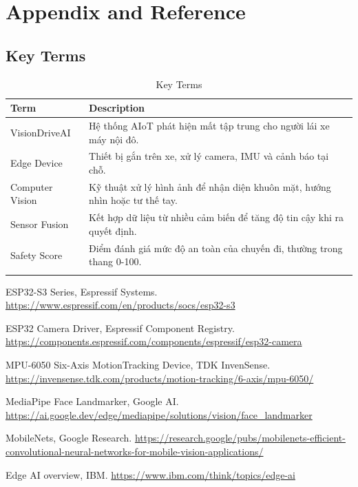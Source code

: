 \documentclass[12pt,a4paper]{article}
\begin{document}
\newpage
\section{Appendix and Reference}

\subsection{Key Terms}

\begin{longtable}{|P{3.2cm}|P{11.2cm}|}
\hline
\textbf{Term} & \textbf{Description} \\
\hline
VisionDriveAI & Hệ thống AIoT phát hiện mất tập trung cho người lái xe máy nội đô. \\
\hline
Edge Device & Thiết bị gắn trên xe, xử lý camera, IMU và cảnh báo tại chỗ. \\
\hline
Computer Vision & Kỹ thuật xử lý hình ảnh để nhận diện khuôn mặt, hướng nhìn hoặc tư thế tay. \\
\hline
Sensor Fusion & Kết hợp dữ liệu từ nhiều cảm biến để tăng độ tin cậy khi ra quyết định. \\
\hline
Safety Score & Điểm đánh giá mức độ an toàn của chuyến đi, thường trong thang 0-100. \\
\hline
\caption{Key Terms}
\end{longtable}

\begin{thebibliography}{9}
ESP32-S3 Series, Espressif Systems. \url{https://www.espressif.com/en/products/socs/esp32-s3}

ESP32 Camera Driver, Espressif Component Registry. \url{https://components.espressif.com/components/espressif/esp32-camera}

MPU-6050 Six-Axis MotionTracking Device, TDK InvenSense. \url{https://invensense.tdk.com/products/motion-tracking/6-axis/mpu-6050/}

MediaPipe Face Landmarker, Google AI. \url{https://ai.google.dev/edge/mediapipe/solutions/vision/face_landmarker}

MobileNets, Google Research. \url{https://research.google/pubs/mobilenets-efficient-convolutional-neural-networks-for-mobile-vision-applications/}

Edge AI overview, IBM. \url{https://www.ibm.com/think/topics/edge-ai}
\end{thebibliography}
\end{document}
